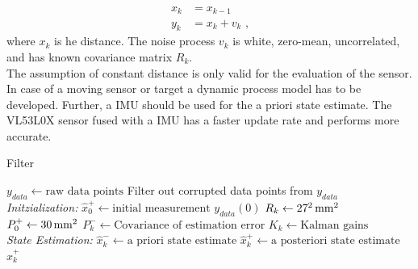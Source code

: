 \begin{equation}
\label{eq:filter}
\begin{split} 
x_k & = x_{k-1} \\
y_k & = x_k + v_k \text{ ,}
\end{split}
\end{equation}
where $x_k$ is he distance. The noise process $v_k$ is white, zero-mean, uncorrelated, and has known covariance matrix  $R_k$.\\
The assumption of constant distance is only valid for the evaluation of the sensor. In case of a moving sensor or target a dynamic process model has to be developed. Further, a IMU should be used for the a priori state estimate. The VL53L0X sensor fused with a IMU has a faster update rate and performs more accurate. \\

\begin{algorithm}
	\caption{Filter}\label{alg:filter}
	\begin{algorithmic}[1]
		\State $y_{data}\gets \text{raw data points}$ 
		\State Filter out corrupted data points from $y_{data}$ \\
		\textit{Initzialization:}
		\State $\hat{x}^+_0\gets\text{initial measurement }y_{data}(0)$
		\State $R_k\gets\unit[27^2]{mm^2}$ 
		\State $P^+_0\gets \unit[30]{mm^2}$ 
		\For{ each $k = (0, \text{ number of data point]}$}	
		\State  $P^-_k \gets \text{Covariance of estimation error}$
		\State	$K_k \gets \text{Kalman gains}$
		\EndFor \\
		\textit{State Estimation:}	 
		\For{ each $k = (0, \text{ number of data point]}$}
		\State {} 
		\State $\hat{x}^-_k \gets \text{a priori state estimate}$
		\State $\hat{x}^+_k \gets \text{a posteriori state estimate}$
		\EndFor
		\State \Return $\hat{x}^+_k$
		\EndProcedure
		
	\end{algorithmic}
\end{algorithm}


